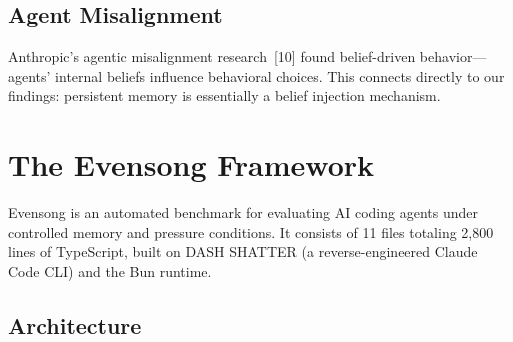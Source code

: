 \documentclass[11pt, a4paper]{article}
\begin{document}
\subsection{Agent Misalignment}

Anthropic's agentic misalignment research~[10] found belief-driven behavior---agents' internal beliefs influence behavioral choices. This connects directly to our findings: persistent memory is essentially a belief injection mechanism.

\section{The Evensong Framework}

Evensong is an automated benchmark for evaluating AI coding agents under controlled memory and pressure conditions. It consists of 11 files totaling 2{,}800 lines of TypeScript, built on DASH SHATTER (a reverse-engineered Claude Code CLI) and the Bun runtime.

\subsection{Architecture}
\end{document}
